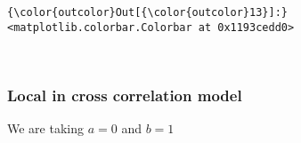 \documentclass[11pt]{article}
\begin{document}
            \begin{Verbatim}[commandchars=\\\{\}]
{\color{outcolor}Out[{\color{outcolor}13}]:} <matplotlib.colorbar.Colorbar at 0x1193cedd0>
\end{Verbatim}
        
    \begin{center}
    \end{center}
    { \hspace*{\fill} \\}
    
    \subsubsection{Local in cross correlation
model}\label{local-in-cross-correlation-model}

We are taking \(a = 0\) and \(b = 1\)
\end{document}
